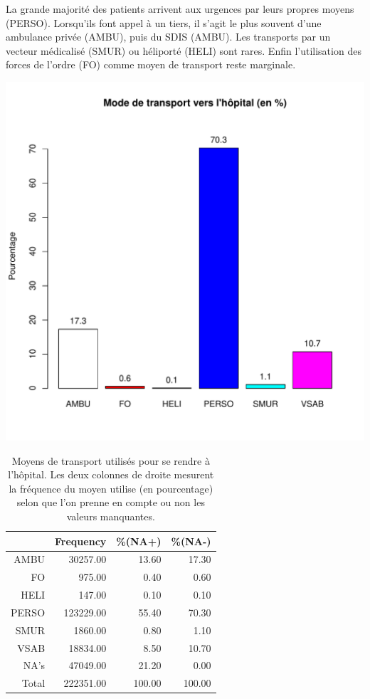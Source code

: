 \documentclass[12pt,english,french,twoside]{report}\usepackage[]{graphicx}\usepackage[]{color}
\makeatletter
\def\maxwidth{ %
  \ifdim\Gin@nat@width>\linewidth
    \linewidth
  \else
    \Gin@nat@width
  \fi
}
\makeatother
\begin{document}
La grande majorité des patients arrivent aux urgences par leurs propres moyens (PERSO). Lorsqu'ils font appel à un tiers, il s'agit le plus souvent d'une ambulance privée (AMBU), puis du SDIS (AMBU). Les transports par un vecteur médicalisé (SMUR) ou héliporté (HELI) sont rares. Enfin l'utilisation des forces de l'ordre (FO) comme moyen de transport reste marginale.


\includegraphics[width=\maxwidth]{figure/transport} 
\begin{table}[ht]
\centering
\begin{tabular}{rrrr}
  \hline
 & Frequency &   \%(NA+) &   \%(NA-) \\ 
  \hline
AMBU & 30257.00 & 13.60 & 17.30 \\ 
  FO & 975.00 & 0.40 & 0.60 \\ 
  HELI & 147.00 & 0.10 & 0.10 \\ 
  PERSO & 123229.00 & 55.40 & 70.30 \\ 
  SMUR & 1860.00 & 0.80 & 1.10 \\ 
  VSAB & 18834.00 & 8.50 & 10.70 \\ 
  NA's & 47049.00 & 21.20 & 0.00 \\ 
    Total & 222351.00 & 100.00 & 100.00 \\ 
   \hline
\end{tabular}
\caption[Moyens de transport]{Moyens de transport utilisés pour se rendre à l'hôpital. Les deux colonnes de droite mesurent la fréquence du moyen utilise (en pourcentage) selon que l'on prenne en compte ou non les valeurs manquantes. } 
\label{transport}
\end{table}
\end{document}
